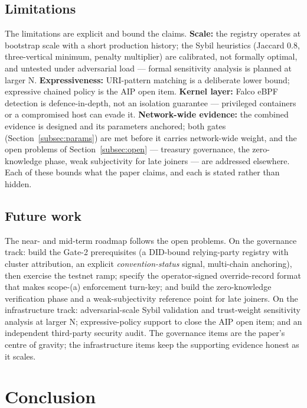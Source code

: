 \subsection{Limitations}
\label{subsec:limits}

The limitations are explicit and bound the claims. \textbf{Scale:} the registry operates at bootstrap scale with a short production history; the Sybil heuristics (Jaccard 0.8, three-vertical minimum, penalty multiplier) are calibrated, not formally optimal, and untested under adversarial load — formal sensitivity analysis is planned at larger N. \textbf{Expressiveness:} URI-pattern matching is a deliberate lower bound; expressive chained policy is the AIP open item. \textbf{Kernel layer:} Falco eBPF detection is defence-in-depth, not an isolation guarantee — privileged containers or a compromised host can evade it. \textbf{Network-wide evidence:} the combined evidence is designed and its parameters anchored; both gates (Section~\ref{subsec:params}) are met before it carries network-wide weight, and the open problems of Section~\ref{subsec:open} — treasury governance, the zero-knowledge phase, weak subjectivity for late joiners — are addressed elsewhere. Each of these bounds what the paper claims, and each is stated rather than hidden.

\subsection{Future work}

The near- and mid-term roadmap follows the open problems. On the governance track: build the Gate-2 prerequisites (a DID-bound relying-party registry with cluster attribution, an explicit \emph{convention-status} signal, multi-chain anchoring), then exercise the testnet ramp; specify the operator-signed override-record format that makes scope-(a) enforcement turn-key; and build the zero-knowledge verification phase and a weak-subjectivity reference point for late joiners. On the infrastructure track: adversarial-scale Sybil validation and trust-weight sensitivity analysis at larger N; expressive-policy support to close the AIP open item; and an independent third-party security audit. The governance items are the paper's centre of gravity; the infrastructure items keep the supporting evidence honest as it scales.

\section{Conclusion}
\label{sec:conclusion}

